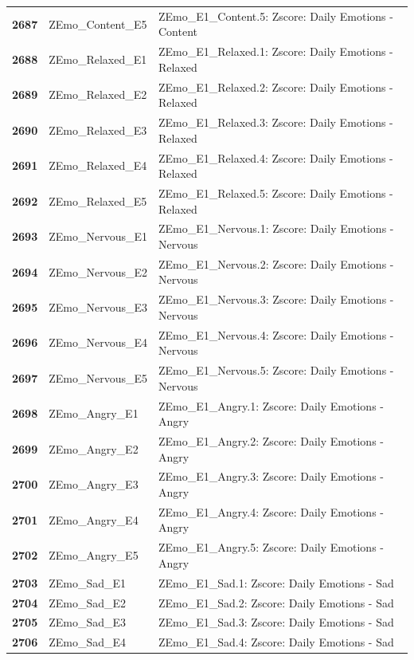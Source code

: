 \documentclass[
  letterpaper,
  DIV=11,
  numbers=noendperiod]{scrartcl}
\begin{document}
\begin{longtable}[t]{>{}cll}
\textbf{2687} & ZEmo\_Content\_E5 & ZEmo\_E1\_Content.5: Zscore:  Daily Emotions - Content\\
\textbf{2688} & ZEmo\_Relaxed\_E1 & ZEmo\_E1\_Relaxed.1: Zscore:  Daily Emotions - Relaxed\\
\textbf{2689} & ZEmo\_Relaxed\_E2 & ZEmo\_E1\_Relaxed.2: Zscore:  Daily Emotions - Relaxed\\
\textbf{2690} & ZEmo\_Relaxed\_E3 & ZEmo\_E1\_Relaxed.3: Zscore:  Daily Emotions - Relaxed\\
\addlinespace
\textbf{2691} & ZEmo\_Relaxed\_E4 & ZEmo\_E1\_Relaxed.4: Zscore:  Daily Emotions - Relaxed\\
\textbf{2692} & ZEmo\_Relaxed\_E5 & ZEmo\_E1\_Relaxed.5: Zscore:  Daily Emotions - Relaxed\\
\textbf{2693} & ZEmo\_Nervous\_E1 & ZEmo\_E1\_Nervous.1: Zscore:  Daily Emotions - Nervous\\
\textbf{2694} & ZEmo\_Nervous\_E2 & ZEmo\_E1\_Nervous.2: Zscore:  Daily Emotions - Nervous\\
\textbf{2695} & ZEmo\_Nervous\_E3 & ZEmo\_E1\_Nervous.3: Zscore:  Daily Emotions - Nervous\\
\addlinespace
\textbf{2696} & ZEmo\_Nervous\_E4 & ZEmo\_E1\_Nervous.4: Zscore:  Daily Emotions - Nervous\\
\textbf{2697} & ZEmo\_Nervous\_E5 & ZEmo\_E1\_Nervous.5: Zscore:  Daily Emotions - Nervous\\
\textbf{2698} & ZEmo\_Angry\_E1 & ZEmo\_E1\_Angry.1: Zscore:  Daily Emotions - Angry\\
\textbf{2699} & ZEmo\_Angry\_E2 & ZEmo\_E1\_Angry.2: Zscore:  Daily Emotions - Angry\\
\textbf{2700} & ZEmo\_Angry\_E3 & ZEmo\_E1\_Angry.3: Zscore:  Daily Emotions - Angry\\
\addlinespace
\textbf{2701} & ZEmo\_Angry\_E4 & ZEmo\_E1\_Angry.4: Zscore:  Daily Emotions - Angry\\
\textbf{2702} & ZEmo\_Angry\_E5 & ZEmo\_E1\_Angry.5: Zscore:  Daily Emotions - Angry\\
\textbf{2703} & ZEmo\_Sad\_E1 & ZEmo\_E1\_Sad.1: Zscore:  Daily Emotions - Sad\\
\textbf{2704} & ZEmo\_Sad\_E2 & ZEmo\_E1\_Sad.2: Zscore:  Daily Emotions - Sad\\
\textbf{2705} & ZEmo\_Sad\_E3 & ZEmo\_E1\_Sad.3: Zscore:  Daily Emotions - Sad\\
\addlinespace
\textbf{2706} & ZEmo\_Sad\_E4 & ZEmo\_E1\_Sad.4: Zscore:  Daily Emotions - Sad\\

\end{longtable}
\end{document}
